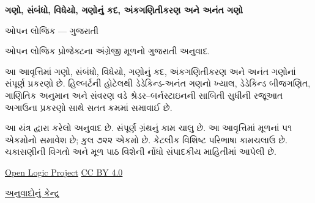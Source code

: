 
\usepackage[authoryear]{natbib}
\renewcommand{\refname}{સંદર્ભગ્રંથો}
\renewcommand{\partname}{ભાગ}
\newenvironment{intro}{}{}
\newcommand{\Id}[1]{\mathord{\mathrm{Id}_{#1}}}
\newcommand{\equivrep}[2]{[#1]_{#2}}
\newcommand{\equivclass}[2]{#1/_{\!{#2}}}
\newcommand{\Intequiv}{\mathrel{\sim_{\Int}}}
\newcommand{\Ratequiv}{\mathrel{\sim_{\Rat}}}
\newcommand{\Realequiv}{\mathrel{\sim_{\Real}}}
\newcommand{\funrestrictionto}[2]{#1\mathord{\restriction}_{#2}}
\newcommand{\funimage}[2]{#1[#2]}
\newcommand{\emptyseq}{\Lambda}
\newcommand{\liff}{\mathbin{\leftrightarrow}}
\newcommand{\dom}[1]{\mathrm{dom}(#1)}
\newcommand{\ran}[1]{\mathrm{ran}(#1)}
\newcommand{\comp}[2]{#2\circ #1}
\newcommand{\pto}{\mathrel{\ooalign{\hfil$\mapstochar\mkern5mu$\hfil\cr$\to$}}}
\newcommand{\fdefined}{\downarrow}
\newcommand{\fundefined}{\uparrow}
\newcommand{\sourcecorrection}[2]{%
  \par\smallskip\noindent
  \fbox{\begin{minipage}{0.94\linewidth}\small
    \textbf{સ્રોત-સુધારો #1.} #2
  \end{minipage}}%
  \par\smallskip}
\newlength{\olphotowidth}
\setlength{\olphotowidth}{.4\textwidth}

\renewcommand{\oliflabeldef}[3]{\ifcsname guavailable@#1\endcsname#2\else#3\fi}

\begin{titlepage}
{\Huge\bfseries ગણો, સંબંધો, વિધેયો, ગણોનું કદ, અંકગણિતીકરણ અને અનંત ગણો\par}
\vspace{1em}
{\Large ઓપન લોજિક — ગુજરાતી\par}
\vspace{2em}
ઓપન લોજિક પ્રોજેક્ટના અંગ્રેજી મૂળનો ગુજરાતી અનુવાદ.\par
\vspace{1em}
આ આવૃત્તિમાં ગણો, સંબંધો, વિધેયો, ગણોનું કદ, અંકગણિતીકરણ અને
અનંત ગણોનાં સંપૂર્ણ પ્રકરણો છે. હિલ્બર્ટની હોટેલથી ડેડેકિન્ડ-અનંત
ગણનો ખ્યાલ, ડેડેકિન્ડ બીજગણિત, ગાણિતિક અનુમાન અને સંવરણ વડે
શ્રેડર--બર્નસ્ટાઇનની સાબિતી સુધીની રજૂઆત અગાઉના પ્રકરણો સાથે સતત
ક્રમમાં સમાવાઈ છે.\par
\vfill
આ યંત્ર દ્વારા કરેલો અનુવાદ છે. સંપૂર્ણ ગ્રંથનું કામ ચાલુ છે.
આ આવૃત્તિમાં મૂળનાં ૫૧ એકમોનો સમાવેશ છે; કુલ ૭૨૨ એકમો છે.
કેટલીક વિશિષ્ટ પરિભાષા કામચલાઉ છે. ચકાસણીની વિગતો અને
મૂળ પાઠ વિશેની નોંધો સંપાદકીય માહિતીમાં આપેલી છે.\par
\vspace{1em}
\href{https://github.com/OpenLogicProject/OpenLogic}{Open Logic Project}
\quad \href{https://creativecommons.org/licenses/by/4.0/}{CC BY 4.0}\par
\href{https://github.com/KokunoYumeto/OpenLogic-translations}{અનુવાદોનું કેન્દ્ર}\par
\end{titlepage}
\tableofcontents
\clearpage

\clearpage

